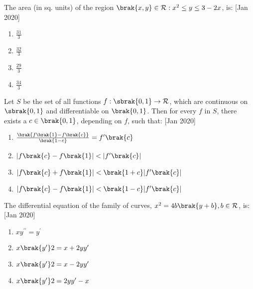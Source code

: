 \iffalse
    \title{2020}
    \author{AI24BTECH11030}
    \section{mcq-single}
\fi

    \item The area (in sq. units) of the region ${\brak{x,y} \in \mathcal{R} : x^2 \leq y \leq 3 - 2x}$, is: \hfill [Jan 2020]
    \begin{multicols}{4}
    \begin{enumerate}
        \item $\frac{31}{3}$
        \item $\frac{32}{3}$
        \item $\frac{29}{3}$
        \item $\frac{34}{3}$
    \end{enumerate}
    \end{multicols}
    
    \item Let $S$ be the set of all functions $f:\sbrak{0,1} \rightarrow \mathcal{R}$, which are continuous on $\sbrak{0, 1}$ and differentiable on $\brak{0, 1}$. Then for every $f$ in $S$, there exists a $c \in \brak{0,1}$, depending on $f$, such that: \hfill [Jan 2020]
    \begin{multicols}{2}
        \begin{enumerate}
            \item $\frac{\brak{f\brak{1}-f\brak{c}}}{\brak{1-c}} = f^\prime\brak{c} $
            \item $|f\brak{c} - f\brak{1}| < |f^\prime\brak{c}| $
            \columnbreak
            \item $|f\brak{c} + f\brak{1}| < \brak{1 + c}|f ^\prime \brak{c}| $
            \item $|f\brak{c} - f\brak{1}| < \brak{1 - c}|f^\prime\brak{c}|$
        \end{enumerate}
    \end{multicols}

    \item The differential equation of the family of curves, $x^2 = 4b\brak{y + b}, b \in \mathcal{R}$, is: \hfill [Jan 2020]
    \begin{multicols}{2}
    \begin{enumerate}
        \item $xy^{\prime\prime} = y^\prime$
        \item $x\brak{y^\prime} 2 = x + 2yy^\prime$
        \columnbreak
        \item $x\brak{y ^\prime } 2 = x - 2yy^\prime$
        \item $x\brak{y ^\prime } 2 = 2yy ^\prime - x$
    \end{enumerate}
    \end{multicols}

